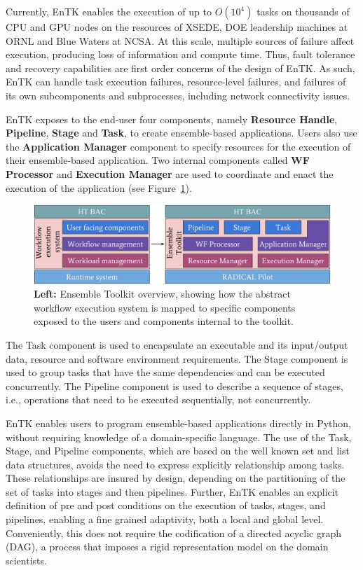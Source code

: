Currently, EnTK enables the execution of up to \(O(10^4)\) tasks on thousands
of CPU and GPU nodes on the resources of XSEDE, DOE leadership machines
at ORNL and Blue Waters at NCSA. At this scale, multiple sources of failure
affect execution, producing loss of information and compute time. Thus, fault
tolerance and recovery capabilities are first order concerns of the design of
EnTK\@. As such, EnTK can handle task execution failures, resource-level
failures, and failures of its own subcomponents and subprocesses, including
network connectivity issues.

EnTK exposes to the end-user four components, namely \textbf{Resource Handle}, \textbf{Pipeline}, \textbf{Stage} and \textbf{Task}, to create ensemble-based applications. Users
also use the \textbf{Application Manager} component to specify resources for
the execution of their ensemble-based application. Two internal components
called \textbf{WF Processor} and \textbf{Execution Manager} are used
to coordinate and enact the execution of the application (see
Figure~\ref{fig:entk_arch}).

\begin{figure}
  \centering
  \includegraphics[width=\columnwidth]{FIGURES/entk_overview.pdf}
  \caption{\textbf{Left:} Ensemble Toolkit overview, showing how the abstract
           workflow execution system is mapped to specific components exposed
           to the users and components internal to the
           toolkit.}\label{fig:entk_arch}
\end{figure}

The Task component is used to encapsulate an executable  and its input/output
data, resource and software environment requirements. The Stage component is
used to group tasks that have the same dependencies and can be executed
concurrently. The Pipeline component is used to describe a sequence of
stages, i.e., operations that need to be executed sequentially, not concurrently.

EnTK enables users to program ensemble-based applications directly in Python,
without requiring knowledge of a domain-specific language. The use of the
Task, Stage, and Pipeline components, which are based on the well known set
and list data structures, avoids the need to express explicitly relationship
among tasks. These relationships are insured by design, depending on the
partitioning of the set of tasks into stages and then pipelines. Further,
EnTK enables an explicit definition of pre and post conditions on the
execution of tasks, stages, and pipelines, enabling a fine grained
adaptivity, both a local and global level. Conveniently, this does not
require the codification of a directed acyclic graph (DAG), a process that imposes a rigid
representation model on the domain scientists.

